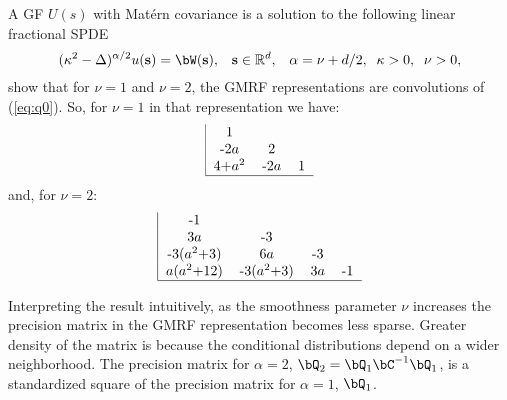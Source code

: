 A GF $U(s)$ with Mat\'ern covariance is a solution 
to the following linear fractional SPDE 
\begin{equation}
(\kappa^2 - \Delta )^{\alpha/2}u(\mathbf{s}) = \bW(\mathbf{s}),\;\;\;
\mathbf{s} \in \mathbb{R}^d,\;\;\;\alpha=\nu+d/2,\;\;\kappa>0,\;\;\nu>0,
\end{equation}
\cite{lindgrenRL:2011} show that for $\nu=1$ and $\nu=2$, 
the GMRF representations are convolutions of (\ref{eq:q0}). 
So, for $\nu=1$ in that representation we have:
\begin{equation}
\begin{tabular}{|ccc} 
1  & & \\
-2$a$ & 2 & \\
4+$a^2$ & -2$a$ & 1 \\
\hline
\end{tabular}
\end{equation}\label{eq:q1}
and, for $\nu=2$:
\begin{equation}
\begin{tabular}{|cccc} 
-1  & & & \\
3$a$ & -3 & & \\
-3($a^2$+3) & 6$a$ & -3 & \\
$a$($a^2$+12) & -3($a^2$+3) & 3$a$ & -1 \\
\hline 
\end{tabular}
\end{equation}\label{eq:q2}

Interpreting the result intuitively, as 
the smoothness parameter $\nu$ 
increases the precision matrix in the GMRF 
representation becomes less sparse. 
Greater density of the matrix is because the conditional 
distributions depend on a wider neighborhood. 
The precision matrix for $\alpha=2$, 
$\bQ_2=\bQ_1\bC^{-1}\bQ_1$, is a standardized  
square of the precision matrix for 
$\alpha=1$, $\bQ_1$. 

